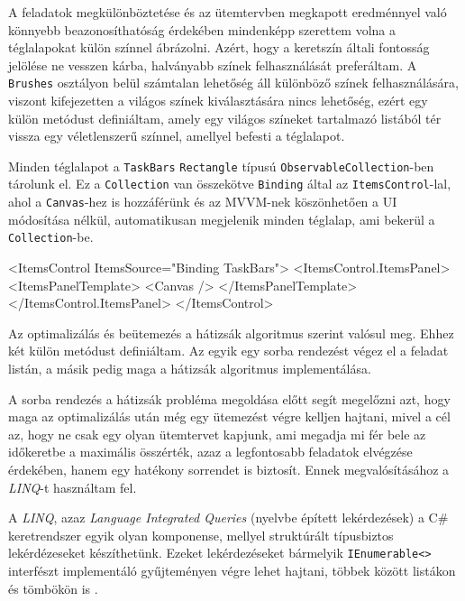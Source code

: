 A feladatok megkülönböztetése és az ütemtervben megkapott eredménnyel való könnyebb beazonosíthatóság érdekében mindenképp szerettem volna a téglalapokat külön színnel ábrázolni. Azért, hogy a keretszín általi fontosság jelölése ne vesszen kárba, halványabb színek felhasználását preferáltam. A \texttt{Brushes} osztályon belül számtalan lehetőség áll különböző színek felhasználására, viszont kifejezetten a világos színek kiválasztására nincs lehetőség, ezért egy külön metódust definiáltam, amely egy világos színeket tartalmazó listából tér vissza egy véletlenszerű színnel, amellyel befesti a téglalapot.

Minden téglalapot a \texttt{TaskBars} \texttt{Rectangle} típusú \texttt{ObservableCollection}-ben tárolunk el. Ez a \texttt{Collection} van összekötve \texttt{Binding} által az \texttt{ItemsControl}-lal, ahol a \texttt{Canvas}-hez is hozzáférünk és az MVVM-nek köszönhetően a UI módosítása nélkül, automatikusan megjelenik minden téglalap, ami bekerül a \texttt{Collection}-be.
\begin{java}
<ItemsControl ItemsSource="{Binding TaskBars}">
    <ItemsControl.ItemsPanel>
        <ItemsPanelTemplate>
            <Canvas />
        </ItemsPanelTemplate>
    </ItemsControl.ItemsPanel>
</ItemsControl>
\end{java}


Az optimalizálás és beütemezés a hátizsák algoritmus szerint valósul meg. Ehhez két külön metódust definiáltam. Az egyik egy sorba rendezést végez el a feladat listán, a másik pedig maga a hátizsák algoritmus implementálása.


A sorba rendezés a hátizsák probléma megoldása előtt segít megelőzni azt, hogy maga az optimalizálás után még egy ütemezést végre kelljen hajtani, mivel a cél az, hogy ne csak egy olyan ütemtervet kapjunk, ami megadja mi fér bele az időkeretbe a maximális összérték, azaz a legfontosabb feladatok elvégzése érdekében, hanem egy hatékony sorrendet is biztosít.
Ennek megvalósításához a \textit{LINQ}-t használtam fel.

A \textit{LINQ}, azaz \textit{Language Integrated Queries} (nyelvbe épített lekérdezések) a C\# keretrendszer egyik olyan komponense, mellyel struktúrált típusbiztos lekérdézeseket készíthetünk. Ezeket lekérdezéseket bármelyik \texttt{IEnumerable<>} interfészt implementáló gyűjteményen végre lehet hajtani, többek között listákon és tömbökön is \cite{linq}.

